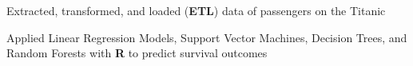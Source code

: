 \documentclass[letterpaper]{deedy-resume} %
\begin{document}
\begin{minipage}[t]{0.66\textwidth}
\begin{tightitemize}
\item Extracted, transformed, and loaded (\textbf{ETL}) data of passengers on the Titanic
\item Applied Linear Regression Models, Support Vector Machines, Decision Trees, and Random Forests with \textbf{R} to predict survival outcomes
\end{tightitemize}

\sectionspace %

\end{minipage} %








\end{document}
